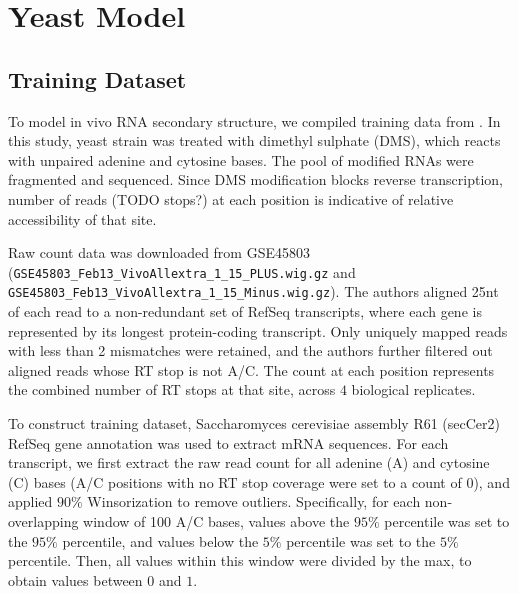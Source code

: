 \documentclass{proposal}
\begin{document}

%
%

\chapter{Yeast Model}

\section{Training Dataset}

To model in vivo RNA secondary structure, we compiled training data from \cite{rouskin2014genome}.
In this study, yeast strain was treated with ﻿dimethyl sulphate (DMS), which reacts with ﻿unpaired adenine and cytosine bases.
The pool of modified RNAs were fragmented and sequenced.
Since ﻿DMS modification blocks reverse transcription, ﻿
number of reads (TODO stops?) at each position is indicative of relative accessibility of that site.

Raw count data was downloaded from GSE45803 (\verb|GSE45803_Feb13_VivoAllextra_1_15_PLUS.wig.gz| and \verb|GSE45803_Feb13_VivoAllextra_1_15_Minus.wig.gz|).
The authors aligned 25nt of each read to a non-redundant set of RefSeq transcripts,
where each gene is represented by its longest protein-coding transcript.
Only uniquely mapped reads with less than 2 mismatches were retained,
and the authors further filtered out aligned reads whose RT stop is not A/C.
The count at each position represents the combined number of RT stops at that site, across $4$ biological replicates.

To construct training dataset, Saccharomyces cerevisiae assembly R61 (secCer2) RefSeq gene annotation was used to extract mRNA sequences.
For each transcript, we first extract the raw read count for all adenine (A) and cytosine (C) bases
(A/C positions with no RT stop coverage were set to a count of $0$),
and applied ﻿$90\%$ Winsorization to remove outliers.
Specifically, for each non-overlapping window of 100 A/C bases, values above the $95\%$ percentile was set to the $95\%$ percentile,
and values below the $5\%$ percentile was set to the $5\%$ percentile.
Then, all values within this window were divided by the max, to obtain values between $0$ and $1$.
\end{document}
